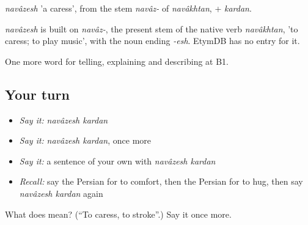 \emph{navâzesh} 'a caress', from the stem \emph{navâz-} of \emph{navâkhtan}, + \emph{kardan}.

\begin{cousinweb}
\emph{navâzesh} is built on \emph{navâz-}, the present stem of the native verb \emph{navâkhtan}, 'to caress; to play music', with the noun ending \emph{-esh}. EtymDB has no entry for it.
\end{cousinweb}

\begin{grammarlens}[title={What you've built}]
One more word for telling, explaining and describing at B1.
\end{grammarlens}

\subsection*{Your turn}
\begin{itemize}
\raggedright
  \item \emph{Say it:} \emph{navâzesh kardan}
  \item \emph{Say it:} \emph{navâzesh kardan}, once more
  \item \emph{Say it:} a sentence of your own with \emph{navâzesh kardan}
  \item \emph{Recall:} say the Persian for to comfort, then the Persian for to hug, then say \emph{navâzesh kardan} again
\end{itemize}

\begin{tcolorbox}[breakable,colback=teal!4,colframe=teal!35!black,title={Before you move on}]
What does   mean? (\textquotedblleft{}To caress, to stroke\textquotedblright{}.) Say it once more.
\end{tcolorbox}
